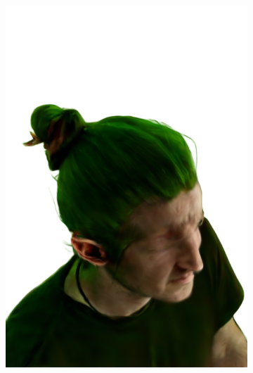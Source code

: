 \begin{figure}
\begin{subfigure}{0.18\linewidth}
        \includegraphics[width=\textwidth]{Figures/failed/igs2gs/15_render.png}

\end{subfigure}
\end{figure}
